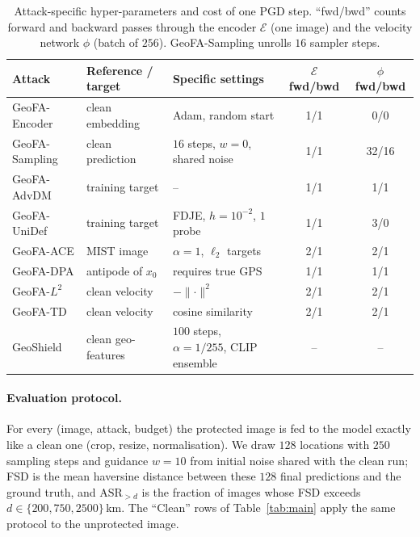 \begin{table}[h]
\centering\small\setlength{\tabcolsep}{5pt}
\caption{Attack-specific hyper-parameters and cost of one PGD step. ``fwd/bwd'' counts
forward and backward passes through the encoder $\mathcal{E}$ (one image) and the velocity
network $\phi$ (batch of $256$). GeoFA-Sampling unrolls $16$ sampler steps.}
\label{tab:hyperparams-specific}
\begin{tabular}{lllcc}
\toprule
Attack & Reference / target & Specific settings & $\mathcal{E}$ fwd/bwd & $\phi$ fwd/bwd \\
\midrule
GeoFA-Encoder  & clean embedding      & Adam, random start          & 1/1 & 0/0 \\
GeoFA-Sampling & clean prediction     & $16$ steps, $w=0$, shared noise & 1/1 & 32/16 \\
GeoFA-AdvDM    & training target      & --                          & 1/1 & 1/1 \\
GeoFA-UniDef   & training target      & FDJE, $h=10^{-2}$, $1$ probe & 1/1 & 3/0 \\
GeoFA-ACE      & MIST image           & $\alpha=1$, $\ell_2$ targets & 2/1 & 2/1 \\
GeoFA-DPA      & antipode of $x_0$    & requires true GPS           & 1/1 & 1/1 \\
GeoFA-$L^2$    & clean velocity       & $-\lVert\cdot\rVert^2$      & 2/1 & 2/1 \\
GeoFA-TD       & clean velocity       & cosine similarity           & 2/1 & 2/1 \\
\midrule
GeoShield      & clean geo-features   & $100$ steps, $\alpha=1/255$, CLIP ensemble & -- & -- \\
\bottomrule
\end{tabular}
\end{table}

\paragraph{Evaluation protocol.}
For every (image, attack, budget) the protected image is fed to the model exactly like a
clean one (crop, resize, normalisation). We draw $128$ locations with $250$ sampling steps
and guidance $w=10$ from initial noise shared with the clean run; FSD is the mean haversine
distance between these $128$ final predictions and the ground truth, and
$\mathrm{ASR}_{>d}$ is the fraction of images whose FSD exceeds $d\in\{200,750,2500\}$\,km.
The ``Clean'' rows of Table~\ref{tab:main} apply the same protocol to the unprotected image.

